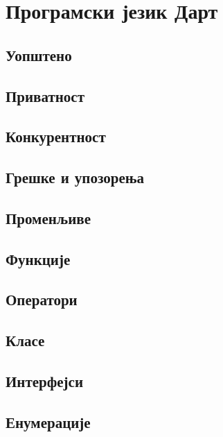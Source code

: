 \documentclass[12pt,oneside]{memoir}
\begin{document}
\chapter{Програмски језик Дарт}
\label{chp:dart}

\section{Уопштено}

\section{Приватност}

\section{Конкурентност}

\section{Грешке и упозорења}

\section{Променљиве}

\section{Функције}

\section{Оператори}

\section{Класе}

\section{Интерфејси}

\section{Енумерације}
\end{document}
